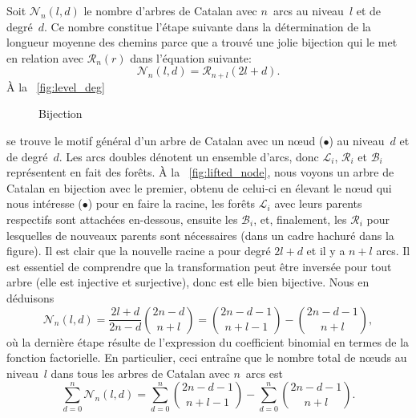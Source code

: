 Soit \(\mathcal{N}_n(l,d)\) le nombre d'arbres de Catalan avec
\(n\)~arcs au niveau~\(l\) et de degré~\(d\). Ce nombre constitue
l'étape suivante dans la détermination de la longueur moyenne des
chemins parce que \cite{Ruskey_1983} a trouvé une jolie bijection qui
le met en relation avec \(\mathcal{R}_n(r)\) dans l'équation suivante:
\begin{equation*}
\mathcal{N}_n(l,d) = \mathcal{R}_{n+l}(2l+d).
\end{equation*}
À la \fig~\ref{fig:level_deg}
\begin{figure}
\centering
{}
\quad
{}
\caption{Bijection\label{fig:bij_root_level}}
\end{figure}
se trouve le motif général d'un arbre de Catalan avec un n{\oe}ud
(\(\bullet\)) au niveau~\(d\) et de degré~\(d\). Les arcs doubles
dénotent un ensemble d'arcs, donc \(\mathcal{L}_i\), \(\mathcal{R}_i\)
et \(\mathcal{B}_i\) représentent en fait des forêts. À la
\fig~\ref{fig:lifted_node}, nous voyons un arbre de Catalan en
bijection avec le premier, obtenu de celui-ci en élevant le n{\oe}ud
qui nous intéresse (\(\bullet\)) pour en faire la racine, les forêts
\(\mathcal{L}_i\) avec leurs parents respectifs sont attachées
en-dessous, ensuite les \(\mathcal{B}_i\), et, finalement, les
\(\mathcal{R}_i\) pour lesquelles de nouveaux parents sont nécessaires
(dans un cadre hachuré dans la figure). Il est clair que la nouvelle
racine a pour degré \(2l+d\) et il y a \(n+l\) arcs. Il est essentiel
de comprendre que la transformation peut être inversée pour tout arbre
(elle est injective et surjective), donc est elle bien bijective. Nous
en déduisons
\begin{equation*}
\mathcal{N}_n(l,d) = \frac{2l+d}{2n-d}\binom{2n-d}{n+l}
= \binom{2n-d-1}{n+l-1} - \binom{2n-d-1}{n+l},
\end{equation*}
où la dernière étape résulte de l'expression du coefficient binomial en termes de la fonction factorielle. En particulier, ceci entraîne que le nombre total de n{\oe}uds au niveau~\(l\) dans tous les arbres de Catalan avec \(n\)~arcs est
\begin{equation*}
\sum_{d=0}^{n}\mathcal{N}_n(l,d)
  = \sum_{d=0}^{n}\binom{2n-d-1}{n+l-1}
    - \sum_{d=0}^{n}\binom{2n-d-1}{n+l}.
\end{equation*}
